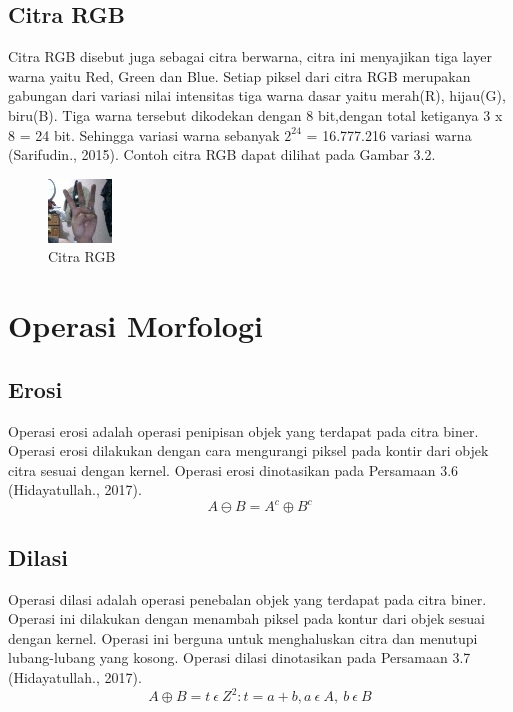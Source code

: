 \subsection{Citra RGB}
Citra RGB disebut juga sebagai citra berwarna, citra ini menyajikan tiga layer warna yaitu Red, Green dan Blue. Setiap piksel dari citra RGB merupakan gabungan dari variasi nilai intensitas tiga warna dasar yaitu merah(R), hijau(G), biru(B). Tiga warna tersebut dikodekan dengan 8 bit,dengan total ketiganya 3 x 8 = 24 bit. Sehingga variasi warna sebanyak $2^{24}$ = 16.777.216 variasi warna (Sarifudin., 2015). Contoh citra RGB dapat dilihat pada Gambar 3.2.
\begin{figure}[H]
	\centering
	\includegraphics[width=0.35\linewidth]{29}
	\caption{Citra RGB}
	\label{fig:29}
\end{figure}
\section{Operasi Morfologi}
\subsection{Erosi}
Operasi erosi adalah operasi penipisan objek yang terdapat pada citra biner. Operasi erosi dilakukan dengan cara mengurangi piksel pada kontir dari objek citra sesuai dengan kernel. Operasi erosi dinotasikan pada Persamaan 3.6 (Hidayatullah., 2017).
\begin{equation}
A \ominus B = A^c \oplus B^c
\end{equation}
\subsection{Dilasi}
Operasi dilasi adalah operasi penebalan  objek yang terdapat pada citra biner. Operasi ini dilakukan dengan menambah piksel pada kontur dari objek sesuai dengan kernel. Operasi ini berguna untuk menghaluskan citra dan menutupi lubang-lubang yang kosong. Operasi dilasi dinotasikan pada Persamaan 3.7 (Hidayatullah., 2017).
\begin{equation}
A \oplus B = t \ \epsilon \ Z^2 : t = a + b, a \ \epsilon \ A, \ b \ \epsilon \ B
\end{equation}

